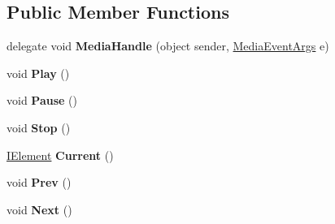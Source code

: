 \subsection*{Public Member Functions}
\begin{DoxyCompactItemize}
\item 
\hypertarget{class_media_motion_1_1_modules_1_1_media_player_1_1_a_media_player_a152a3352c27602e3a3305390bcc16fe6}{delegate void {\bfseries Media\+Handle} (object sender, \hyperlink{class_media_motion_1_1_modules_1_1_media_player_1_1_events_1_1_media_event_args}{Media\+Event\+Args} e)}\label{class_media_motion_1_1_modules_1_1_media_player_1_1_a_media_player_a152a3352c27602e3a3305390bcc16fe6}

\item 
\hypertarget{class_media_motion_1_1_modules_1_1_media_player_1_1_a_media_player_a35d6aea691f8ba6365f684c5865842d9}{void {\bfseries Play} ()}\label{class_media_motion_1_1_modules_1_1_media_player_1_1_a_media_player_a35d6aea691f8ba6365f684c5865842d9}

\item 
\hypertarget{class_media_motion_1_1_modules_1_1_media_player_1_1_a_media_player_aeebef99202d3ac2f833f519c09c71c0d}{void {\bfseries Pause} ()}\label{class_media_motion_1_1_modules_1_1_media_player_1_1_a_media_player_aeebef99202d3ac2f833f519c09c71c0d}

\item 
\hypertarget{class_media_motion_1_1_modules_1_1_media_player_1_1_a_media_player_a45bb4d272b2022559e61210034ddc78e}{void {\bfseries Stop} ()}\label{class_media_motion_1_1_modules_1_1_media_player_1_1_a_media_player_a45bb4d272b2022559e61210034ddc78e}

\item 
\hypertarget{class_media_motion_1_1_modules_1_1_media_player_1_1_a_media_player_a820d9a90f7091a20ec57621be67880fa}{\hyperlink{interface_media_motion_1_1_core_1_1_models_1_1_interfaces_1_1_i_element}{I\+Element} {\bfseries Current} ()}\label{class_media_motion_1_1_modules_1_1_media_player_1_1_a_media_player_a820d9a90f7091a20ec57621be67880fa}

\item 
\hypertarget{class_media_motion_1_1_modules_1_1_media_player_1_1_a_media_player_acddad4e17eee316ca8550df77b17a7e5}{void {\bfseries Prev} ()}\label{class_media_motion_1_1_modules_1_1_media_player_1_1_a_media_player_acddad4e17eee316ca8550df77b17a7e5}

\item 
\hypertarget{class_media_motion_1_1_modules_1_1_media_player_1_1_a_media_player_a0471286e48a8708a6128f0677323ee34}{void {\bfseries Next} ()}\label{class_media_motion_1_1_modules_1_1_media_player_1_1_a_media_player_a0471286e48a8708a6128f0677323ee34}


\end{DoxyCompactItemize}
